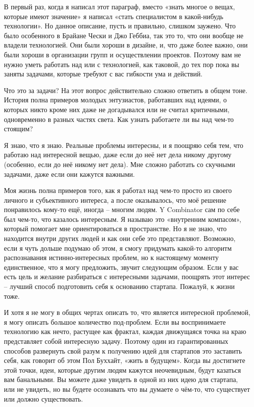 \documentclass[ebook,12pt,oneside,openany]{memoir}
\begin{document}
В первый раз, когда я написал этот параграф, вместо «знать многое о
вещах, которые имеют значение» я написал «стать специалистом в
какой-нибудь технологии». Но данное описание, пусть и правильно,
слишком заужено. Что было особенного в Брайане Чески и Джо Геббиа, так
это то, что они вообще не владели технологией. Они были хороши в
дизайне, и, что даже более важно, они были хороши в организации групп
и осуществлении проектов. Поэтому вам не нужно уметь работать над или
с технологией, как таковой, до тех пор пока вы заняты задачами,
которые требуют с вас гибкости ума и действий.

Что это за задачи? На этот вопрос действительно сложно ответить в
общем тоне. История полна примеров молодых энтузиастов, работавших над
идеями, о которых никто кроме них даже не догадывался или не считал
критичными, одновременно в разных частях света. Как узнать работаете
ли вы над чем-то стоящим?

Я знаю, что я знаю. Реальные проблемы интересны, и я поощряю себя тем,
что работаю над интересной вещью, даже если до неё нет дела никому
другому (особенно, если до неё никому нет дела). Мне сложно работать
со скучными задачами, даже если они кажутся важными.

Моя жизнь полна примеров того, как я работал над чем-то просто из
своего личного и субъективного интереса, а после оказывалось, что моё
решение понравилось кому-то ещё, иногда – многим людям. Y Combinator
сам по себе был чем-то, что казалось интересным. Я называю это
«внутренним компасом», который помогает мне ориентироваться в
пространстве. Но я не знаю, что находится внутри других людей и как
они себе это представляют. Возможно, если я чуть дольше подумаю об
этом, я смогу придумать какой-то алгоритм распознавания
истинно-интересных проблем, но к настоящему моменту единственное, что
я могу предложить, звучит следующим образом. Если у вас есть цель и
желание разбираться с интересными задачами, поощрять этот интерес –
лучший способ подготовить себя к основанию стартапа. Пожалуй, к жизни
тоже.

И хотя я не могу в общих чертах описать то, что является интересной
проблемой, я могу описать большое количество под-проблем. Если вы
воспринимаете технологию как нечто, растущее как фрактал, каждая
движущаяся точка на краю представляет собой интересную задачу. Поэтому
один из гарантированных способов развернуть свой разум к получению
идей для стартапов это заставить себя, как говорит об этом Пол
Буххайт, «жить в будущем». Когда вы достигнете этой точки, идеи,
которые другим людям кажутся неочевидным, будут казаться вам
банальными. Вы можете даже увидеть в одной из них идею для стартапа,
или не увидеть, но вы будете осознавать что вы думаете о чём-то, что
существует или должно существовать.
\end{document}
